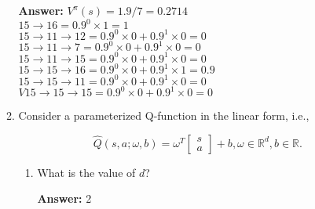 \documentclass{assignment}
\begin{document}
\begin{problem}
\begin{enumerate}
\begin{enumerate}[label=(\alph*)]
        \color{blue}\textbf{Answer:} $V^{\pi}(s) = 1.9/7 = 0.2714$\\
            $15 \rightarrow 16 = 0.9^0 \times 1 = 1$\\
            $15 \rightarrow 11 \rightarrow 12 = 0.9^0 \times 0 + 0.9^1 \times 0 = 0$\\
            $15 \rightarrow 11 \rightarrow 7 = 0.9^0 \times 0 + 0.9^1 \times 0 = 0$\\
            $15 \rightarrow 11 \rightarrow 15 = 0.9^0 \times 0 + 0.9^1 \times 0 = 0$\\
            $15 \rightarrow 15 \rightarrow 16 = 0.9^0 \times 0 + 0.9^1 \times 1 = 0.9$\\
            $15 \rightarrow 15 \rightarrow 11 = 0.9^0 \times 0 + 0.9^1 \times 0 = 0$\\
            $V15 \rightarrow 15 \rightarrow 15 = 0.9^0 \times 0 + 0.9^1 \times 0 = 0$
        \color{black}


    
        \item Consider a parameterized Q-function in the linear form, i.e.,

        \begin{displaymath}
            \hat{Q}(s, a; \omega, b) = \omega^T \begin{bmatrix}
                s\\
                a
                \end{bmatrix} + b, \omega \in \mathbb{R}^d, b \in \mathbb{R}.
            \tag*{(1-1)}
        \end{displaymath}

        \begin{enumerate}[label=\roman*.]


    
        \item What is the value of $d$?

        \color{blue}\textbf{Answer:} 
            2
        \color{black}



\end{enumerate}
\end{enumerate}
\end{enumerate}
\end{problem}
\end{document}
